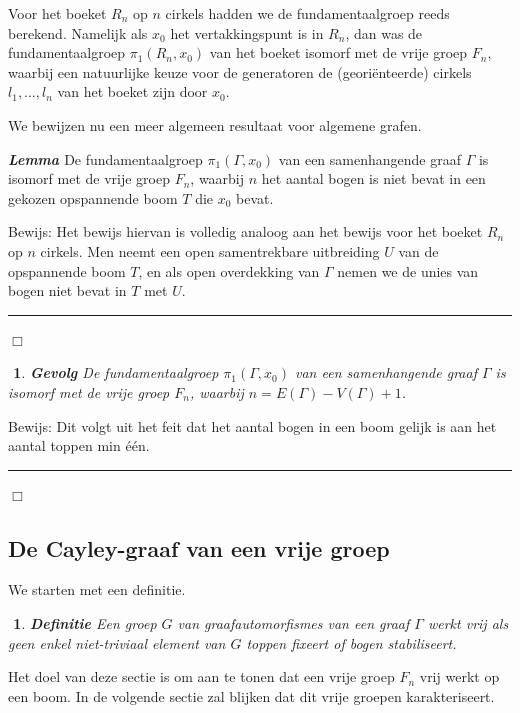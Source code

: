 \documentclass[12pt]{book}
\newcommand{\bew}{{\sc Bewijs: }}
\newcommand{\B}{\rule{1mm}{0mm} \hfill $\Box$ }
\newenvironment{lem}{\begin{lemh}{\em {\bf Lemma }}}{\end{lemh}}
\newtheorem{gevh}[stelh]{$\!\!$}
\newenvironment{gev}{\begin{gevh}{\em {\bf Gevolg }}}{\end{gevh}}
\newtheorem{dfh}[stelh]{$\!\!$}
\newenvironment{df}{\begin{dfh} \em {\bf Definitie }}{\end{dfh}}
\begin{document}
Voor het boeket $R_n$  op $n$ cirkels hadden we de fundamentaalgroep reeds berekend. Namelijk als $x_0$ het vertakkingspunt is in $R_n$, dan was de fundamentaalgroep $\pi_1(R_n,x_0)$ van het boeket isomorf met de vrije groep $F_n$, waarbij een natuurlijke keuze voor de generatoren de (geori\"enteerde) cirkels $l_1, \dots, l_n$ van het boeket zijn door $x_0$.

%

We bewijzen nu een meer algemeen resultaat voor algemene grafen.

\begin{lem}\label{fungra}
De fundamentaalgroep $\pi_1(\Gamma, x_0)$ van een samenhangende graaf $\Gamma$ is isomorf met de vrije groep $F_n$, waarbij $n$ het aantal bogen is niet bevat in een gekozen opspannende boom $T$ die $x_0$ bevat.
\end{lem}
\bew
Het bewijs hiervan is volledig analoog aan het bewijs voor het boeket $R_n$ op $n$ cirkels. Men neemt een open samentrekbare uitbreiding $U$ van de opspannende boom $T$, en als open overdekking van $\Gamma$ nemen we de unies van bogen niet bevat in $T$ met $U$. \B

\begin{gev}\label{numbergen}
De fundamentaalgroep $\pi_1(\Gamma, x_0)$ van een samenhangende graaf $\Gamma$ is isomorf met de vrije groep $F_n$, waarbij $n = E(\Gamma) - V(\Gamma) + 1$.
\end{gev}
\bew
Dit volgt uit het feit dat het aantal bogen in een boom gelijk is aan het aantal toppen min \'e\'en.
\B


\subsection{De Cayley-graaf van een vrije groep}

We starten met een definitie.
\begin{df}
Een groep $G$ van graafautomorfismes van een graaf $\Gamma$ werkt \emph{vrij} als geen enkel niet-triviaal element van $G$ toppen fixeert of bogen stabiliseert.
\end{df}

Het doel van deze sectie is om aan te tonen dat een vrije groep $F_n$ vrij werkt op een boom. In de volgende sectie zal blijken dat dit vrije groepen karakteriseert.
\end{document}
